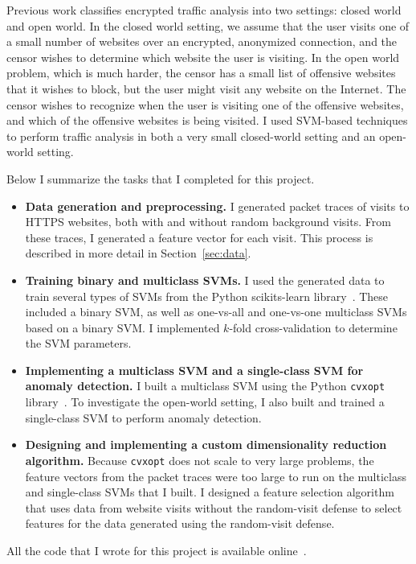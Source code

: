 \documentclass[10pt, twocolumn]{article}
\begin{document}
Previous work classifies encrypted traffic analysis into two settings: 
closed world and open world. In the closed world setting, we assume that 
the user visits one of a small number of websites over an encrypted, 
anonymized connection, and the censor wishes to determine which website 
the user is visiting. In the open world problem, which is much harder, the 
censor has a small list of offensive websites that it wishes to block, but 
the user might visit any website on the Internet. The censor wishes to 
recognize when the user is visiting one of the offensive websites, and which 
of the offensive websites is being visited. I used SVM-based techniques to 
perform traffic analysis in both a very small closed-world setting and an 
open-world setting.

Below I summarize the tasks that I completed for this project.
\begin{itemize}
\item \textbf{Data generation and preprocessing.} I generated packet 
traces of visits to HTTPS websites, both with and without random 
background visits. From these traces, I generated a feature vector for 
each visit. This process is described in more detail in Section~\ref{sec:data}. 
\item \textbf{Training binary and multiclass SVMs.} I used the 
generated data to train several types of SVMs from the Python scikits-learn 
library~\cite{sklearn}. These included a binary SVM, as well as one-vs-all
and one-vs-one multiclass SVMs based on a binary SVM. I implemented $k$-fold cross-validation 
to determine the SVM parameters.
\item \textbf{Implementing a multiclass SVM and a single-class SVM for anomaly detection.} 
I built a multiclass SVM using the Python \texttt{cvxopt} library~\cite{cvxopt}.
 To investigate the 
open-world setting, I also built and trained a single-class SVM to perform 
anomaly detection.
\item \textbf{Designing and implementing a custom dimensionality reduction algorithm.} 
Because \texttt{cvxopt} does not scale to very large problems, the feature vectors from the 
packet traces were too large to run on the multiclass and single-class SVMs that I built. 
I designed a feature selection algorithm that uses data from website visits without the 
random-visit defense to select features for the data generated using the random-visit defense.
\end{itemize}

All the code that I wrote for this project is available online~\cite{github}.
\end{document}
